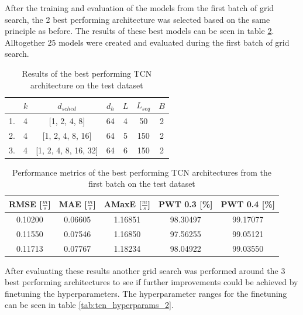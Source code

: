 After the training and evaluation of the models from the first batch of grid search, the 2 best performing architecture was selected based on the same principle as before. The results of these best models can be seen in table \ref{tab:tcn_best_model_1_metrics}. Alltogether 25 models were created and evaluated during the first batch of grid search. 

\FloatBarrier
\begin{table}[h]
    \centering
    \begin{tabular}{|c|c|c|c|c|c|c|}
        \hline
          & \textbf{$k$} & \textbf{$d_{sched}$} & \textbf{$d_h$} & \textbf{$L$} & \textbf{$L_{seq}$} & \textbf{$B$}\\
        \hline \hline
        1. & 4 & [1, 2, 4, 8] & 64 & 4 & 50 & 2\\
        \hline
        2. & 4 & [1, 2, 4, 8, 16] & 64 & 5 & 150 & 2\\
        \hline
        3. & 4 & [1, 2, 4, 8, 16, 32] & 64 & 6 & 150 & 2\\
        \hline
    \end{tabular}
    \caption{Results of the best performing TCN architecture on the test dataset}
    \label{tab:tcn_best_models_1}
\end{table}
\FloatBarrier

\FloatBarrier
\begin{table}[h]
    \centering
    \begin{tabular}{|c|c|c|c|c|}
        \hline
        \textbf{RMSE [$\frac{m}{s}$]} & \textbf{MAE [$\frac{m}{s}$]} & \textbf{AMaxE [$\frac{m}{s}$]} & \textbf{PWT 0.3 [\%]} & \textbf{PWT 0.4 [\%]} \\
        \hline \hline
        0.10200 & 0.06605 & 1.16851 & 98.30497 & 99.17077 \\
        \hline
        0.11550 & 0.07546 & 1.16850 & 97.56255 & 99.05121 \\
        \hline
        0.11713 & 0.07767 & 1.18234 & 98.04922 & 99.03550 \\
        \hline
    \end{tabular}
    \caption{Performance metrics of the best performing TCN architectures from the first batch on the test dataset}
    \label{tab:tcn_best_model_1_metrics}
\end{table}
\FloatBarrier

After evaluating these results another grid search was performed around the 3 best performing architectures to see if further improvements could be achieved by finetuning the hyperparameters. The hyperparameter ranges for the finetuning can be seen in table \ref{tab:tcn_hyperparams_2}.


